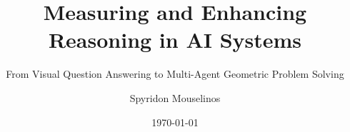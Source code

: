 \documentclass{beamer}
\title{Measuring and Enhancing Reasoning in AI Systems}
\subtitle{From Visual Question Answering to Multi-Agent Geometric Problem Solving}
\author{Spyridon Mouselinos}
\institute{University of Warsaw \\ \vspace{0.3em} \small{Supervisors: Henryk Michalewski, Mateusz Malinowski}}
\date{\today}
\begin{document}
\frame{\titlepage}



\end{document}
